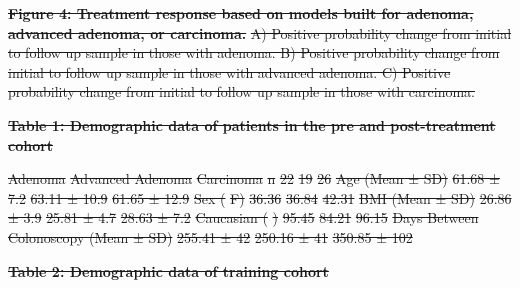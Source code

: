 \documentclass[12pt,]{article}
\providecommand{\DIFdeltex}[1]{{\protect\color{red}\sout{#1}}}                      %
\providecommand{\DIFdel}[1]{\texorpdfstring{\DIFdeltex{#1}}{}} %
\begin{document}
\textbf{\DIFdel{Figure 4: Treatment response based on models built for adenoma,
advanced adenoma, or carcinoma.}} %
\DIFdel{A) Positive probability change from
initial to follow up sample in those with adenoma. B) Positive
probability change from initial to follow up sample in those with
advanced adenoma. C) Positive probability change from initial to follow
up sample in those with carcinoma.
}%


\textbf{\DIFdel{Table 1: Demographic data of patients in the pre and
post-treatment cohort}}

\DIFdel{Adenoma }%
\DIFdel{Advanced Adenoma }%
\DIFdel{Carcinoma}%
\DIFdel{n }%
\DIFdel{22 }%
\DIFdel{19 }%
\DIFdel{26}%
\DIFdel{Age (Mean ± SD) }%
\DIFdel{61.68 ± 7.2 }%
\DIFdel{63.11 ± 10.9 }%
\DIFdel{61.65 ±
12.9}%
\DIFdel{Sex (}%
\DIFdel{F) }%
\DIFdel{36.36 }%
\DIFdel{36.84 }%
\DIFdel{42.31}%
\DIFdel{BMI (Mean ± SD) }%
\DIFdel{26.86 ± 3.9 }%
\DIFdel{25.81 ± 4.7 }%
\DIFdel{28.63 ± 7.2}%
\DIFdel{Caucasian (}%
\DIFdel{) }%
\DIFdel{95.45 }%
\DIFdel{84.21 }%
\DIFdel{96.15}%
\DIFdel{Days Between Colonoscopy (Mean ± SD) }%
\DIFdel{255.41 ± 42 }%
\DIFdel{250.16 ± 41 }%
\DIFdel{350.85 ± 102}%


\textbf{\DIFdel{Table 2: Demographic data of training cohort}}
\end{document}
